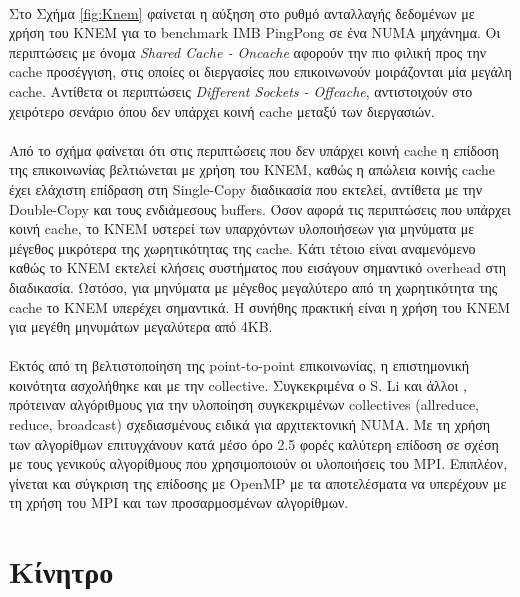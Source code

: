 \paragraph{}
Στο Σχήμα \ref{fig:Knem} φαίνεται η αύξηση στο ρυθμό ανταλλαγής δεδομένων με χρήση του KNEM για το benchmark IMB PingPong σε ένα NUMA μηχάνημα. Οι περιπτώσεις με όνομα \textit{Shared Cache - Oncache} αφορούν την πιο φιλική προς την cache προσέγγιση, στις οποίες οι διεργασίες που επικοινωνούν μοιράζονται μία μεγάλη cache. Αντίθετα οι περιπτώσεις \textit{Different Sockets - Offcache}, αντιστοιχούν στο χειρότερο σενάριο όπου δεν υπάρχει κοινή cache μεταξύ των διεργασιών.
\paragraph{}
Από το σχήμα φαίνεται ότι στις περιπτώσεις που δεν υπάρχει κοινή cache η επίδοση της επικοινωνίας βελτιώνεται με χρήση του KNEM, καθώς η απώλεια κοινής cache έχει ελάχιστη επίδραση στη Single-Copy διαδικασία που εκτελεί, αντίθετα με την Double-Copy και τους ενδιάμεσους buffers. Όσον αφορά τις περιπτώσεις που υπάρχει κοινή cache, το KNEM υστερεί των υπαρχόντων υλοποιήσεων για μηνύματα με μέγεθος μικρότερα της χωρητικότητας της cache. Κάτι τέτοιο είναι αναμενόμενο καθώς το KNEM εκτελεί κλήσεις συστήματος που εισάγουν σημαντικό overhead στη διαδικασία. Ωστόσο, για μηνύματα με μέγεθος μεγαλύτερο από τη χωρητικότητα της cache το KNEM υπερέχει σημαντικά. Η συνήθης πρακτική είναι η χρήση του KNEM για μεγέθη μηνυμάτων μεγαλύτερα από 4ΚΒ.

\paragraph{}
Εκτός από τη βελτιστοποίηση της point-to-point επικοινωνίας, η επιστημονική κοινότητα ασχολήθηκε και με την collective. Συγκεκριμένα ο S. Li και άλλοι \cite{Sli}, πρότειναν αλγόριθμους για την υλοποίηση συγκεκριμένων collectives (allreduce, reduce, broadcast) σχεδιασμένους ειδικά για αρχιτεκτονική NUMA. Με τη χρήση των αλγορίθμων επιτυγχάνουν κατά μέσο όρο 2.5 φορές καλύτερη επίδοση σε σχέση με τους γενικούς αλγορίθμους που χρησιμοποιούν οι υλοποιήσεις του MPI. Επιπλέον, γίνεται και σύγκριση της επίδοσης με OpenMP με τα αποτελέσματα να υπερέχουν με τη χρήση του MPI και των προσαρμοσμένων αλγορίθμων. 

\section{Κίνητρο}
